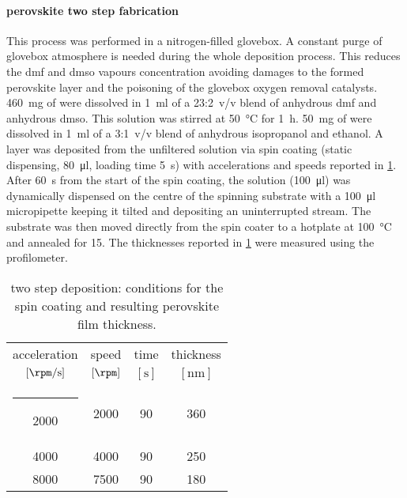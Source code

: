 		\FloatBarrier
		\paragraph{ perovskite two step fabrication}
		This process was performed in a nitrogen-filled glovebox. A constant purge of glovebox atmosphere is needed during the whole deposition process. This reduces the \gls{dmf} and \gls{dmso} vapours concentration avoiding damages to the formed perovskite layer and the poisoning of the glovebox oxygen removal catalysts.
		\SI{460}{\mg} of \PbItwo were dissolved in \SI{1}{\ml} of a 23:2~v/v blend of anhydrous \gls{dmf} and anhydrous \gls{dmso}. This solution was stirred at \SI{50}{\celsius} for \SI{1}{\hour}. \SI{50}{\mg} of  were dissolved in \SI{1}{\ml} of a 3:1~v/v blend of anhydrous isopropanol and ethanol. A \PbItwo layer was deposited from the unfiltered solution via spin coating (static dispensing, \SI{80}{\ul}, loading time \SI{5}{\s}) with accelerations and speeds reported in \cref{mapi_thickness}. After \SI{60}{\s} from the start of the spin coating, the  solution (\SI{100}{\ul}) was dynamically dispensed on the centre of the spinning substrate with a \SI{100}{\ul} micropipette keeping it tilted and depositing an uninterrupted stream. The substrate was then moved directly from the spin coater to a hotplate at \SI{100}{\celsius} and annealed for \SI{15}{\min}. The thicknesses reported in \cref{mapi_thickness} were measured using the profilometer.

		\begin{table}%
			\caption{ two step deposition: conditions for the \PbItwo spin coating and resulting perovskite film thickness.}\label{mapi_thickness}
			\begin{center}
				\begin{tabular}{c c c | c}
					acceleration        & speed         & time        & thickness    \\
					$[\si{\rpm\per\s}]$ & $[\si{\rpm}]$ & $[\si{\s}]$ & $[\si{\nm}]$ \\
					\hline
					\rule[0ex]{-4pt}{3ex}
					2000                & 2000          & 90          & 360          \\
					4000                & 4000          & 90          & 250          \\
					8000                & 7500          & 90          & 180          \\
				\end{tabular}
			\end{center}
		\end{table}

